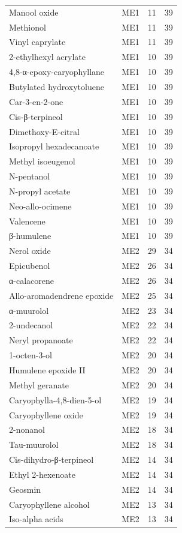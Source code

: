 {\begin{longtable}{lrrr}
Manool oxide & ME1 & 11 & 39 \\
Methionol & ME1 & 11 & 39 \\
Vinyl caprylate & ME1 & 11 & 39 \\
2-ethylhexyl acrylate & ME1 & 10 & 39 \\
4,8-α-epoxy-caryophyllane & ME1 & 10 & 39 \\
Butylated hydroxytoluene & ME1 & 10 & 39 \\
Car-3-en-2-one & ME1 & 10 & 39 \\
Cis-β-terpineol & ME1 & 10 & 39 \\
Dimethoxy-E-citral & ME1 & 10 & 39 \\
Isopropyl hexadecanoate & ME1 & 10 & 39 \\
Methyl isoeugenol & ME1 & 10 & 39 \\
N-pentanol & ME1 & 10 & 39 \\
N-propyl acetate & ME1 & 10 & 39 \\
Neo-allo-ocimene & ME1 & 10 & 39 \\
Valencene & ME1 & 10 & 39 \\
β-humulene & ME1 & 10 & 39 \\
Nerol oxide & ME2 & 29 & 34 \\
Epicubenol & ME2 & 26 & 34 \\
α-calacorene & ME2 & 26 & 34 \\
Allo-aromadendrene epoxide & ME2 & 25 & 34 \\
α-muurolol & ME2 & 23 & 34 \\
2-undecanol & ME2 & 22 & 34 \\
Neryl propanoate & ME2 & 22 & 34 \\
1-octen-3-ol & ME2 & 20 & 34 \\
Humulene epoxide II & ME2 & 20 & 34 \\
Methyl geranate & ME2 & 20 & 34 \\
Caryophylla-4,8-dien-5-ol & ME2 & 19 & 34 \\
Caryophyllene oxide & ME2 & 19 & 34 \\
2-nonanol & ME2 & 18 & 34 \\
Tau-muurolol & ME2 & 18 & 34 \\
Cis-dihydro-β-terpineol & ME2 & 14 & 34 \\
Ethyl 2-hexenoate & ME2 & 14 & 34 \\
Geosmin & ME2 & 14 & 34 \\
Caryophyllene alcohol & ME2 & 13 & 34 \\
Iso-alpha acids & ME2 & 13 & 34 \\

\end{longtable}}

